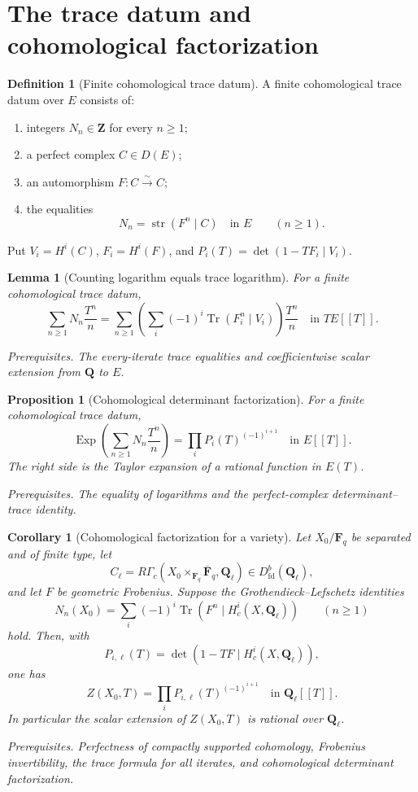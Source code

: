 \documentclass[10pt]{article}
\newtheorem{proposition}[theorem]{Proposition}
\newtheorem{corollary}[theorem]{Corollary}
\newtheorem{lemma}[theorem]{Lemma}
\theoremstyle{definition}
\newtheorem{definition}[theorem]{Definition}
\newcommand{\Fq}{\mathbf F_q}
\newcommand{\Fbar}{\overline{\mathbf F}_q}
\newcommand{\Ql}{\mathbf Q_\ell}
\newcommand{\Tr}{\operatorname{Tr}}
\newcommand{\deps}[1]{\par\smallskip\noindent\textit{Prerequisites.} #1}
\begin{document}
\section{The trace datum and cohomological factorization}

\begin{definition}[Finite cohomological trace datum]
A finite cohomological trace datum over \(E\) consists of:
\begin{enumerate}[label=\textup{(\roman*)}]
\item integers \(N_n\in\mathbf Z\) for every \(n\geq1\);
\item a perfect complex \(C\in D(E)\);
\item an automorphism \(F:C\xrightarrow{\sim}C\);
\item the equalities
\[
 N_n=\operatorname{str}(F^n\mid C)
 \quad\text{in }E
 \qquad(n\geq1).
\]
\end{enumerate}
Put \(V_i=H^i(C)\), \(F_i=H^i(F)\), and
\(P_i(T)=\det(1-TF_i\mid V_i)\).
\end{definition}

\begin{lemma}[Counting logarithm equals trace logarithm]
For a finite cohomological trace datum,
\[
 \sum_{n\geq1}N_n\frac{T^n}{n}
 =\sum_{n\geq1}\left(
   \sum_i(-1)^i\Tr(F_i^n\mid V_i)
  \right)\frac{T^n}{n}
 \quad\text{in }TE[[T]].
\]
\deps{The every-iterate trace equalities and coefficientwise scalar
extension from \(\mathbf Q\) to \(E\).}
\end{lemma}

\begin{proposition}[Cohomological determinant factorization]
For a finite cohomological trace datum,
\[
 \operatorname{Exp}\left(\sum_{n\geq1}N_n\frac{T^n}{n}\right)
 =\prod_iP_i(T)^{(-1)^{i+1}}
 \quad\text{in }E[[T]].
\]
The right side is the Taylor expansion of a rational function in \(E(T)\).
\deps{The equality of logarithms and the perfect-complex
determinant--trace identity.}
\end{proposition}

\begin{corollary}[Cohomological factorization for a variety]
Let \(X_0/\Fq\) be separated and of finite type, let
\[
 C_\ell=R\Gamma_c(X_0\times_{\Fq}\Fbar,\Ql)
 \in D^b_{\mathrm{fd}}(\Ql),
\]
and let \(F\) be geometric Frobenius.  Suppose the
Grothendieck--Lefschetz identities
\[
 N_n(X_0)=\sum_i(-1)^i
 \Tr(F^n\mid H_c^i(X,\Ql))
 \qquad(n\geq1)
\]
hold.  Then, with
\[
 P_{i,\ell}(T)=
 \det(1-TF\mid H_c^i(X,\Ql)),
\]
one has
\[
 Z(X_0,T)=\prod_iP_{i,\ell}(T)^{(-1)^{i+1}}
 \quad\text{in }\Ql[[T]].
\]
In particular the scalar extension of \(Z(X_0,T)\) is rational over
\(\Ql\).
\deps{Perfectness of compactly supported cohomology, Frobenius
invertibility, the trace formula for all iterates, and cohomological
determinant factorization.}
\end{corollary}
\end{document}
